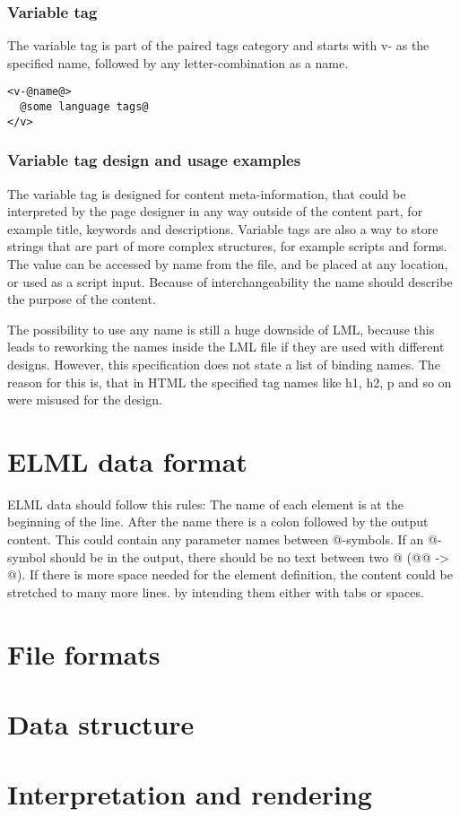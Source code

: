 \documentclass[12pt,a4paper]{article}
\begin{document}
\subsubsection*{Variable tag}
The variable tag is part of the paired tags category and starts with v- as the specified name, followed by any letter-combination as a name.
\begin{lstlisting}[frame=single,style=base]
<v-@name@>
  @some language tags@
</v>
\end{lstlisting}
\begin{tcolorbox}[parbox=false]
\subsubsection*{Variable tag design and usage examples}
The variable tag is designed for content meta-information, that could be interpreted by the page designer in any way outside of the content part, for example title, keywords and descriptions. Variable tags are also a way to store strings that are part of more complex structures, for example scripts and forms. The value can be accessed by name from the file, and be placed at any location, or used as a script input. Because of interchangeability the name should describe the purpose of the content.

The possibility to use any name is still a huge downside of LML, because this leads to reworking the names inside the LML file if they are used with different designs. However, this specification does not state a list of binding names. The reason for this is, that in HTML the specified tag names like h1, h2, p and so on were misused for the design.
\end{tcolorbox}


\section{ELML data format}

ELML data should follow this rules: The name of each element is at the beginning of the line. After the name there is a colon followed by the output content. This could contain any parameter names between @-symbols. If an @-symbol should be in the output, there should be no text between two @ (@@ -> @). If there is more space needed for the element definition, the content could be stretched to many more lines. by intending them either with tabs or spaces.

\section{File formats}

\section{Data structure}

\section{Interpretation and rendering}
\end{document}
